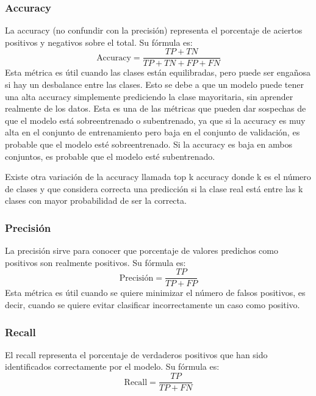 \subsubsection{Accuracy}

La accuracy (no confundir con la precisión) representa el porcentaje de aciertos positivos y negativos sobre el total.
Su fórmula es:
\begin{equation}
	\text{Accuracy} = \frac{TP + TN}{TP + TN + FP + FN}
\end{equation}
Esta métrica es útil cuando las clases están equilibradas, pero puede ser engañosa si hay un desbalance entre las clases.
Esto se debe a que un modelo puede tener una alta accuracy simplemente prediciendo la clase mayoritaria, sin aprender realmente de los datos.
Esta es una de las métricas que pueden dar sospechas de que el modelo está sobreentrenado o subentrenado, ya que si la accuracy es muy alta en el conjunto de entrenamiento pero baja en el conjunto de validación, es probable que el modelo esté sobreentrenado.
Si la accuracy es baja en ambos conjuntos, es probable que el modelo esté subentrenado.

Existe otra variación de la accuracy llamada top k accuracy donde k es el número de clases y que considera correcta una predicción si la clase real está entre las k clases con mayor probabilidad de ser la correcta.

\subsubsection{Precisión}

La precisión sirve para conocer que porcentaje de valores predichos como positivos son realmente positivos.
Su fórmula es:
\begin{equation}
	\text{Precisión} = \frac{TP}{TP + FP}
\end{equation}
Esta métrica es útil cuando se quiere minimizar el número de falsos positivos, es decir, cuando se quiere evitar clasificar incorrectamente un caso como positivo.

\subsubsection{Recall}

El recall representa el porcentaje de verdaderos positivos que han sido identificados correctamente por el modelo.
Su fórmula es:
\begin{equation}
	\text{Recall} = \frac{TP}{TP + FN}
\end{equation}

